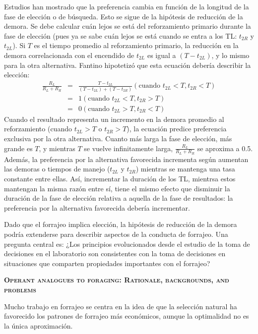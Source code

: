 \documentclass[a4paper,12pt]{article}
\begin{document}
Estudios han mostrado que la preferencia cambia en función de la longitud de la fase de elección o de búsqueda. Esto se sigue de la hipótesis de reducción de la demora. Se debe calcular cuán lejos se está del reforzamiento primario durante la fase de elección (pues ya se sabe cuán lejos se está cuando se entra a los TL: $t_{2R}$ y $t_{2L}$). Si $T$ es el tiempo promedio al reforzamiento primario, la reducción en la demora correlacionada con el encendido de $t_{2L}$ es igual a $(T-t_{2L})$, y lo mismo para la otra alternativa. Fantino hipotetizó que esta ecuación debería describir la elección:
\begin{equation}
	\begin{array}{lcl}
		\frac{R_L}{R_L+R_R}&=&\frac{T-t_{2L}}{(T-t_{2L})+(T-t_{2R})} (\mbox{cuando }t_{2L} < T, t_{2R}<T)\\
				   &=&1(\mbox{cuando } t_{2L}<T,t_{2R}>T)\\
				   &=&0(\mbox{cuando } t_{2L}>T,t_{2R}<T)
	\end{array}
\end{equation}
Cuando el resultado representa un incremento en la demora promedio al reforzamiento (cuando $t_{2L}>T$ o $t_{2R}>T$), la ecuación predice preferencia exclusiva por la otra alternativa.
Cuanto más larga la fase de elección, más grande es $T$, y mientras $T$ se vuelve infinitamente larga, $\frac{R_L}{R_L+R_R}$ se aproxima a 0.5. Además, la preferencia por la alternativa favorecida incrementa según aumentan las demoras o tiempos de manejo ($t_{2L}$ y $t_{2R}$) mientras se mantenga una tasa constante entre ellas. Así, incrementar la duración de los TL, mientrsa estos mantengan la misma razón entre sí, tiene el mismo efecto que disminuir la duración de la fase de elección relativa a aquella de la fase de resultados: la preferencia por la alternativa favorecida debería incrementar.

Dado que el forrajeo implica elección, la hipótesis de reducción de la demora podría extenderse para describir aspectos de la conducta de forrajeo. Una pregunta central es: ¿Los principios evolucionados desde el estudio de la toma de decisiones en el laboratorio son consistentes con la toma de decisiones en situaciones que comparten propiedades importantes con el forrajeo?

{\scshape\bfseries Operant analogues to foraging: Rationale, backgrounds, and problems}

Mucho trabajo en forrajeo se centra en la idea de que la selección natural ha favorecido los patrones de forrajeo más económicos, aunque la optimalidad no es la única aproximación.
\end{document}
